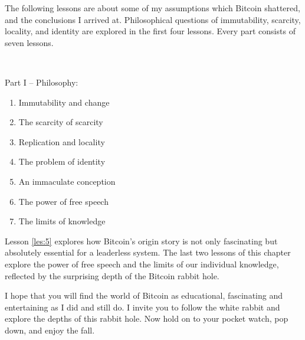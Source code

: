 The following lessons are about some of my assumptions which Bitcoin shattered,
and the conclusions I arrived at. Philosophical questions of immutability,
scarcity, locality, and identity are explored in the first four lessons.  Every
part consists of seven lessons.

~

Part I -- Philosophy:

\begin{enumerate}
  \item Immutability and change
  \item The scarcity of scarcity
  \item Replication and locality
  \item The problem of identity
  \item An immaculate conception
  \item The power of free speech
  \item The limits of knowledge
\end{enumerate}

Lesson \ref{les:5} explores how Bitcoin's origin story is not only fascinating but
absolutely essential for a leaderless system. The last two lessons of this
chapter explore the power of free speech and the limits of our individual
knowledge, reflected by the surprising depth of the Bitcoin rabbit hole.

I hope that you will find the world of Bitcoin as educational, fascinating and
entertaining as I did and still do. I invite you to follow the white rabbit and
explore the depths of this rabbit hole. Now hold on to your pocket watch, pop
down, and enjoy the fall.
